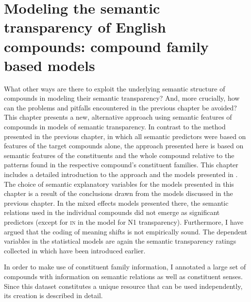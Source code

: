 \chapter[Compound family based models]{Modeling the semantic transparency of  English compounds: compound family based models}
\label{cha:empirical-2}
What other ways are there to exploit the underlying semantic structure
of compounds in modeling their semantic transparency? And, more
crucially, how can the problems and pitfalls encountered in the
previous chapter be avoided? This chapter presents a new, alternative approach using semantic features of
compounds in models of semantic transparency. In contrast to the
method presented in the previous chapter, in which all semantic
predictors were based on features of the target compounds alone, the
approach presented here is based on semantic features of the constituents
and the whole compound relative to the patterns found in the
respective compound's constituent families. This chapter includes a
detailed introduction to the approach and the models presented in \citet{BellandSchaefer:2016}. 
The choice of semantic explanatory variables for the models presented in this chapter is a result
of the conclusions drawn from the models discussed in the
previous chapter. %
In the mixed effects
models presented there, the semantic relations used in the individual
compounds did not emerge as significant predictors (except for
\textsc{in} in the model for N1 transparency). Furthermore, I have
argued that the coding of meaning shifts is not empirically sound.
The dependent variables in the statistical models are again
the semantic transparency ratings collected in \citet{Reddyetal:2011}
which have been introduced earlier.

In order to make use of constituent family information, I annotated a
large set of compounds with information on semantic relations as well
as constituent senses. Since this dataset constitutes a unique
resource that can be used independently, its creation is described in
detail. 

